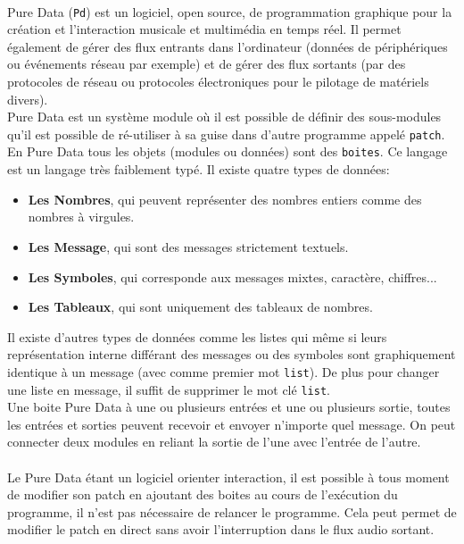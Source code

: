 \documentclass[a4paper, titlepage, oneside, 12pt]{article}%
\begin{document}
\paragraph{}
Pure Data (\texttt{Pd}) est un logiciel, open source, de programmation graphique pour la création et l’interaction musicale et multimédia en temps réel. Il permet également de gérer des flux entrants dans l'ordinateur (données de périphériques ou événements réseau par exemple) et de gérer des flux sortants (par des protocoles de réseau ou protocoles électroniques pour le pilotage de matériels divers).\\
Pure Data est un système module où il est possible de définir des sous-modules qu'il est possible de ré-utiliser à sa guise dans d'autre programme appelé \texttt{patch}.\\
En Pure Data tous les objets (modules ou données) sont des \texttt{boites}.
Ce langage est un langage très faiblement typé. Il existe quatre types de données:\\
\begin{itemize}
\item \textbf{Les Nombres}, qui peuvent représenter des nombres entiers comme des nombres à virgules.
\item \textbf{Les Message}, qui sont des messages strictement textuels.
\item \textbf{Les Symboles}, qui corresponde aux messages mixtes, caractère, chiffres...
\item \textbf{Les Tableaux}, qui sont uniquement des tableaux de nombres.
\end{itemize}
Il existe d'autres types de données comme les listes qui même si leurs représentation interne différant des messages ou des symboles sont graphiquement identique à un message (avec comme premier mot \texttt{list}). De plus pour changer une liste en message, il suffit de supprimer le mot clé \texttt{list}.\\
Une boite Pure Data à une ou plusieurs entrées et une ou plusieurs sortie, toutes les entrées et sorties peuvent recevoir et envoyer n'importe quel message. On peut connecter deux modules en reliant la sortie de l'une avec l'entrée de l'autre.


\paragraph{}
Le Pure Data étant un logiciel orienter interaction, il est possible à tous moment de modifier son patch en ajoutant des boites au cours de l’exécution du programme, il n'est pas nécessaire de relancer le programme. Cela peut permet de modifier le patch en direct sans avoir l’interruption dans le flux audio sortant.
\end{document}
